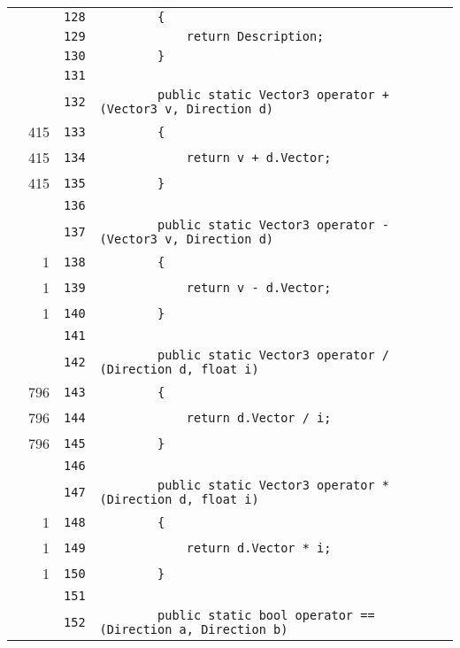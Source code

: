 \documentclass[a4paper,10pt]{article}
\begin{document}
\begin{longtable}[l]{lrrl}
\cellcolor{gray} &  & \verb~128~ & \verb~        {~\\
\cellcolor{gray} &  & \verb~129~ & \verb~            return Description;~\\
\cellcolor{gray} &  & \verb~130~ & \verb~        }~\\
\cellcolor{gray} &  & \verb~131~ & \verb~~\\
\cellcolor{gray} &  & \verb~132~ & \verb~        public static Vector3 operator + (Vector3 v, Direction d)~\\
\cellcolor{green} & 415 & \verb~133~ & \verb~        {~\\
\cellcolor{green} & 415 & \verb~134~ & \verb~            return v + d.Vector;~\\
\cellcolor{green} & 415 & \verb~135~ & \verb~        }~\\
\cellcolor{gray} &  & \verb~136~ & \verb~~\\
\cellcolor{gray} &  & \verb~137~ & \verb~        public static Vector3 operator - (Vector3 v, Direction d)~\\
\cellcolor{green} & 1 & \verb~138~ & \verb~        {~\\
\cellcolor{green} & 1 & \verb~139~ & \verb~            return v - d.Vector;~\\
\cellcolor{green} & 1 & \verb~140~ & \verb~        }~\\
\cellcolor{gray} &  & \verb~141~ & \verb~~\\
\cellcolor{gray} &  & \verb~142~ & \verb~        public static Vector3 operator / (Direction d, float i)~\\
\cellcolor{green} & 796 & \verb~143~ & \verb~        {~\\
\cellcolor{green} & 796 & \verb~144~ & \verb~            return d.Vector / i;~\\
\cellcolor{green} & 796 & \verb~145~ & \verb~        }~\\
\cellcolor{gray} &  & \verb~146~ & \verb~~\\
\cellcolor{gray} &  & \verb~147~ & \verb~        public static Vector3 operator * (Direction d, float i)~\\
\cellcolor{green} & 1 & \verb~148~ & \verb~        {~\\
\cellcolor{green} & 1 & \verb~149~ & \verb~            return d.Vector * i;~\\
\cellcolor{green} & 1 & \verb~150~ & \verb~        }~\\
\cellcolor{gray} &  & \verb~151~ & \verb~~\\
\cellcolor{gray} &  & \verb~152~ & \verb~        public static bool operator == (Direction a, Direction b)~\\

\end{longtable}
\end{document}

